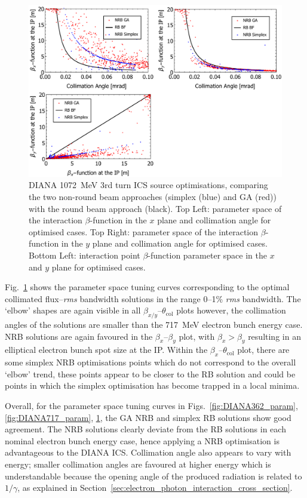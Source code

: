 \documentclass[../main.tex]{subfiles}
\begin{document}
\begin{figure}[!h]
\centering
\includegraphics[width=\textwidth]{Figures/DIANA_Inverse_Compton_Source_Design/DIANA1072param.pdf}
\caption{DIANA 1072~\si{\mega\electronvolt} 3rd turn ICS source optimisations, comparing the two non-round beam approaches (simplex (blue) and GA (red)) with the round beam approach (black). Top Left: parameter space of the interaction $\beta$-function in the $x$ plane and collimation angle for optimised cases. Top Right: parameter space of the interaction $\beta$-function in the $y$ plane and collimation angle for optimised cases. Bottom Left: interaction point $\beta$-function parameter space in the $x$ and $y$ plane for optimised cases.}
\label{fig:DIANA1072_param}
\end{figure}

Fig.~\ref{fig:DIANA1072_param} shows the parameter space tuning curves corresponding to the optimal collimated flux--\textit{rms} bandwidth solutions in the range 0--1\% \textit{rms} bandwidth. The `elbow' shapes are again visible in all $\beta_{x/y}$--$\theta_{\mathrm{col}}$ plots however, the collimation angles of the solutions are smaller than the 717~\si{\mega\electronvolt} electron bunch energy case. NRB solutions are again favoured in the $\beta_{x}$--$\beta_{y}$ plot, with $\beta_{x}>\beta_{y}$ resulting in an elliptical electron bunch spot size at the IP. Within the $\beta_x$--$\theta_{\mathrm{col}}$ plot, there are some simplex NRB optimisations points which do not correspond to the overall `elbow' trend, these points appear to be closer to the RB solution and could be points in which the simplex optimisation has become trapped in a local minima. 

Overall, for the parameter space tuning curves in Figs.~\ref{fig:DIANA362_param}, \ref{fig:DIANA717_param}, \ref{fig:DIANA1072_param}, the GA NRB and simplex RB solutions show good agreement. The NRB solutions clearly deviate from the RB solutions in each nominal electron bunch energy case, hence applying a NRB optimisation is advantageous to the DIANA ICS. Collimation angle also appears to vary with energy; smaller collimation angles are favoured at higher energy which is understandable because the opening angle of the produced radiation is related to $1/\gamma$, as explained in Section~\ref{sec:electron_photon_interaction_cross_section}.    
\end{document}
